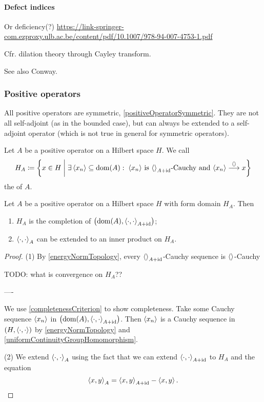 \paragraph{Defect indices}
Or deficiency(?)
\url{https://link-springer-com.ezproxy.ulb.ac.be/content/pdf/10.1007/978-94-007-4753-1.pdf}

Cfr. dilation theory through Cayley transform.

See also Conway.

\subsubsection{Positive operators}
All positive operators are symmetric, \ref{positiveOperatorSymmetric}. They are not all self-adjoint (as in the bounded case), but can always be extended to a self-adjoint operator (which is not true in general for symmetric operators).

\begin{definition}
Let $A$ be a positive operator on a Hilbert space $H$. We call
\[ H_A \defeq \setbuilder{x\in H}{\exists \seq{x_n}\subseteq \dom(A): \; \text{$\seq{x_n}$ is $\inner{}_{A+\id}$-Cauchy and $\seq{x_n}\overset{\inner{}}{\longrightarrow} x$}} \]
the  of $A$.
\end{definition}

\begin{lemma}
Let $A$ be a positive operator on a Hilbert space $H$ with form domain $H_A$. Then
\begin{enumerate}
\item $H_A$ is the completion of $\sSet{\dom(A), \inner{\cdot, \cdot}_{A+\id}}$;
\item $\left\langle \cdot, \cdot \right\rangle_A$ can be extended to an inner product on $H_A$.
\end{enumerate}
\end{lemma}
\begin{proof}
(1) By \ref{energyNormTopology}, every $\left\langle  \right\rangle_{A+\operatorname{id}}$-Cauchy sequence is $\left\langle  \right\rangle$-Cauchy

TODO: what is convergence on $H_A$??

----

We use \ref{completenessCriterion} to show completeness. Take some Cauchy sequence $\left\langle x_n \right\rangle$ in $\sSet{\dom(A), \inner{\cdot, \cdot}_{A+\id}}$. Then $\left\langle x_n \right\rangle$ is a Cauchy sequence in $\sSet{H,\inner{\cdot, \cdot}}$ by \ref{energyNormTopology} and \ref{uniformContinuityGroupHomomorphism}. 

(2) We extend $\left\langle \cdot, \cdot \right\rangle_A$ using the fact that we can extend $\left\langle \cdot, \cdot \right\rangle_{A+\operatorname{id}}$ to $H_A$ and the equation
\[ \left\langle x, y \right\rangle_A = \left\langle x, y \right\rangle_{A+\operatorname{id}} - \left\langle x,y \right\rangle. \]
\end{proof}




